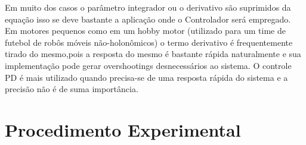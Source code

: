 \documentclass[11pt]{article}
\begin{document}
Em muito dos casos o parâmetro integrador ou o derivativo são suprimidos da equação isso se deve bastante a aplicação onde o Controlador será empregado. Em motores pequenos como em um hobby motor (utilizado para um time de futebol de robôs móveis não-holonômicos) o termo derivativo é frequentemente tirado do mesmo,pois a resposta do mesmo é bastante rápida naturalmente e sua implementação pode gerar overshootings desnecessários ao sistema. O controle PD é mais utilizado quando precisa-se de uma resposta rápida do sistema e a precisão não é de suma importância.
\newpage
\section{Procedimento Experimental}
\end{document}

